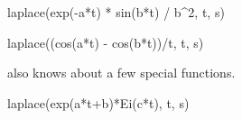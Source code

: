 {{{{{{{{{{{{{\begin{xtc}
\begin{TeXOutput}
\begin{fricasmath}{3}
{{}}%
\end{fricasmath}
\end{TeXOutput}
\end{xtc}
\begin{xtc}
\begin{xtccomment}
\end{xtccomment}
\begin{spadsrc}
laplace(exp(-a*t) * sin(b*t) / b^2, t, s)
\end{spadsrc}
\begin{TeXOutput}
\begin{fricasmath}{4}
%
\end{fricasmath}
\end{TeXOutput}
\end{xtc}
\begin{xtc}
\begin{xtccomment}
\end{xtccomment}
\begin{spadsrc}
laplace((cos(a*t) - cos(b*t))/t, t, s)
\end{spadsrc}
\begin{TeXOutput}
\begin{fricasmath}{5}
%
\end{fricasmath}
\end{TeXOutput}
\end{xtc}
\begin{xtc}
\begin{xtccomment}
\Language{} also knows about a few special functions.
\end{xtccomment}
\begin{spadsrc}
laplace(exp(a*t+b)*Ei(c*t), t, s)
\end{spadsrc}
\begin{TeXOutput}
\begin{fricasmath}{6}
%
\end{fricasmath}
\end{TeXOutput}
\end{xtc}
}}}}}}}}}}}}}
